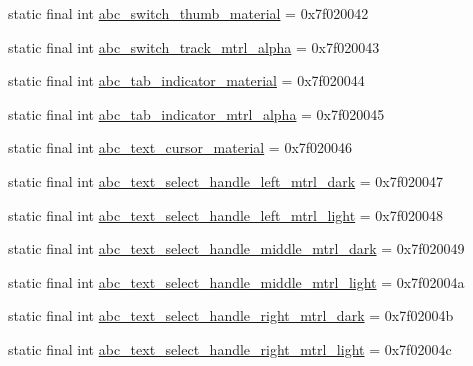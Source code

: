 \begin{CompactItemize}
\item 
static final int \hyperlink{classandroid_1_1support_1_1v7_1_1recyclerview_1_1_r_1_1drawable_f8fd9815bf09dbbc9ec84202fb1c2828}{abc\_\-switch\_\-thumb\_\-material} = 0x7f020042
\item 
static final int \hyperlink{classandroid_1_1support_1_1v7_1_1recyclerview_1_1_r_1_1drawable_01d144ecdb0fe3b439e41e28393c34a9}{abc\_\-switch\_\-track\_\-mtrl\_\-alpha} = 0x7f020043
\item 
static final int \hyperlink{classandroid_1_1support_1_1v7_1_1recyclerview_1_1_r_1_1drawable_52b1c63f663ead0b6cc891c4ae208c9c}{abc\_\-tab\_\-indicator\_\-material} = 0x7f020044
\item 
static final int \hyperlink{classandroid_1_1support_1_1v7_1_1recyclerview_1_1_r_1_1drawable_4a4fad1400e605ee5b27754db0e59a31}{abc\_\-tab\_\-indicator\_\-mtrl\_\-alpha} = 0x7f020045
\item 
static final int \hyperlink{classandroid_1_1support_1_1v7_1_1recyclerview_1_1_r_1_1drawable_2d9731d2c111dd48ee3db2c341431e15}{abc\_\-text\_\-cursor\_\-material} = 0x7f020046
\item 
static final int \hyperlink{classandroid_1_1support_1_1v7_1_1recyclerview_1_1_r_1_1drawable_469f77aad485696cb3169e8a62877575}{abc\_\-text\_\-select\_\-handle\_\-left\_\-mtrl\_\-dark} = 0x7f020047
\item 
static final int \hyperlink{classandroid_1_1support_1_1v7_1_1recyclerview_1_1_r_1_1drawable_7eb693a0a85733fb09faf8f9512f957a}{abc\_\-text\_\-select\_\-handle\_\-left\_\-mtrl\_\-light} = 0x7f020048
\item 
static final int \hyperlink{classandroid_1_1support_1_1v7_1_1recyclerview_1_1_r_1_1drawable_52ed4c9849b4ad343c55ff8ae480bc20}{abc\_\-text\_\-select\_\-handle\_\-middle\_\-mtrl\_\-dark} = 0x7f020049
\item 
static final int \hyperlink{classandroid_1_1support_1_1v7_1_1recyclerview_1_1_r_1_1drawable_0f2bf6ffa766902b146a45e7e8ba963a}{abc\_\-text\_\-select\_\-handle\_\-middle\_\-mtrl\_\-light} = 0x7f02004a
\item 
static final int \hyperlink{classandroid_1_1support_1_1v7_1_1recyclerview_1_1_r_1_1drawable_4b62e493b55f944320f08436e25bbf79}{abc\_\-text\_\-select\_\-handle\_\-right\_\-mtrl\_\-dark} = 0x7f02004b
\item 
static final int \hyperlink{classandroid_1_1support_1_1v7_1_1recyclerview_1_1_r_1_1drawable_d34da0f6d73b8b1ffaba46b35e99bd22}{abc\_\-text\_\-select\_\-handle\_\-right\_\-mtrl\_\-light} = 0x7f02004c
\item 

\end{CompactItemize}
